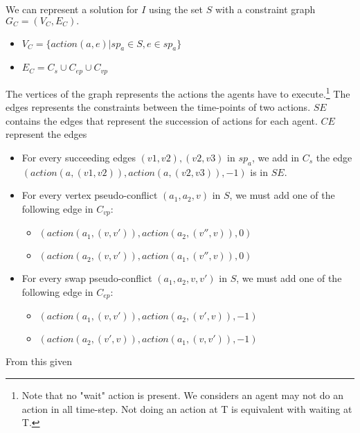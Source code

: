 We can represent a solution for $I$ using the set $S$ with a constraint graph $G_C=(V_C,E_C).$
\begin{itemize}
  \item $V_C = \{action(a,e) | sp_a \in S, e \in sp_a \}$
  \item $E_C = C_s \cup C_{ep} \cup C_{vp}$
\end{itemize}
The vertices of the graph represents the actions the agents have to execute.\footnote{Note that no "wait" action is present. We considers an agent may not do an action in all time-step. Not doing an action at T is equivalent with waiting at T.}
The edges represents the constraints between the time-points of two actions. $SE$ contains the edges that represent the succession of actions for each agent. $CE$ represent the edges

\begin{itemize}
  \item For every succeeding edges $(v1,v2),(v2,v3)$ in $sp_a$, we add in $C_s$ the edge $(action(a,(v1,v2)),action(a,(v2,v3)),-1)$ is in $SE$.
  \item For every vertex pseudo-conflict $(a_1,a_2,v)$ in $S$, we must add one of the following edge in $C_{vp}$:
  \begin{itemize}
    \item $(action(a_1,(v,v')),action(a_2,(v'',v)),0)$
    \item $(action(a_2,(v,v')),action(a_1,(v'',v)),0)$
  \end{itemize}
  \item For every swap pseudo-conflict $(a_1,a_2,v,v')$ in $S$, we must add one of the following edge in $C_{ep}$:
  \begin{itemize}
    \item $(action(a_1,(v,v')),action(a_2,(v',v)),-1)$
    \item $(action(a_2,(v',v)),action(a_1,(v,v')),-1)$
  \end{itemize}
\end{itemize}

From this given
